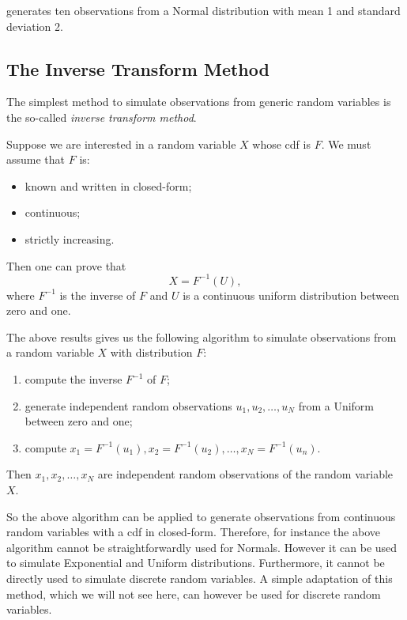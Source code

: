 \documentclass[
]{book}
\begin{document}
generates ten observations from a Normal distribution with mean 1 and standard deviation 2.

\hypertarget{the-inverse-transform-method}{%
\subsection{The Inverse Transform Method}\label{the-inverse-transform-method}}

The simplest method to simulate observations from generic random variables is the so-called \emph{inverse transform method}.

Suppose we are interested in a random variable \(X\) whose cdf is \(F\). We must assume that \(F\) is:

\begin{itemize}
\item
  known and written in closed-form;
\item
  continuous;
\item
  strictly increasing.
\end{itemize}

Then one can prove that
\[
X = F^{-1}(U),
\]
where \(F^{-1}\) is the inverse of \(F\) and \(U\) is a continuous uniform distribution between zero and one.

The above results gives us the following algorithm to simulate observations from a random variable \(X\) with distribution \(F\):

\begin{enumerate}
\def\labelenumi{\arabic{enumi}.}
\item
  compute the inverse \(F^{-1}\) of \(F\);
\item
  generate independent random observations \(u_1,u_2,\dots,u_N\) from a Uniform between zero and one;
\item
  compute \(x_1=F^{-1}(u_1), x_2=F^{-1}(u_2),\dots,x_N=F^{-1}(u_n)\).
\end{enumerate}

Then \(x_1,x_2,\dots,x_N\) are independent random observations of the random variable \(X\).

So the above algorithm can be applied to generate observations from continuous random variables with a cdf in closed-form. Therefore, for instance the above algorithm cannot be straightforwardly used for Normals. However it can be used to simulate Exponential and Uniform distributions. Furthermore, it cannot be directly used to simulate discrete random variables. A simple adaptation of this method, which we will not see here, can however be used for discrete random variables.
\end{document}
